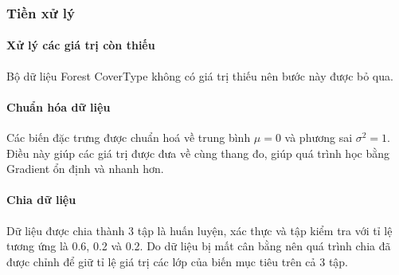 \subsubsection{Tiền xử lý}

\paragraph{Xử lý các giá trị còn thiếu}

Bộ dữ liệu Forest CoverType không có giá trị thiếu nên bước này được bỏ qua.

\paragraph{Chuẩn hóa dữ liệu} Các biến đặc trưng được chuẩn hoá về trung bình
$\mu = 0$ và phương sai $\sigma^2 = 1$. Điều này giúp các giá trị được đưa về
cùng thang đo, giúp quá trình học bằng Gradient ổn định và nhanh hơn.

\paragraph{Chia dữ liệu}

Dữ liệu được chia thành 3 tập là huấn luyện, xác thực và tập kiểm tra với tỉ lệ
tương ứng là 0.6, 0.2 và 0.2. Do dữ liệu bị mất cân bằng nên quá trình chia đã
được chỉnh để giữ tỉ lệ giá trị các lớp của biến mục tiêu trên cả 3 tập.
